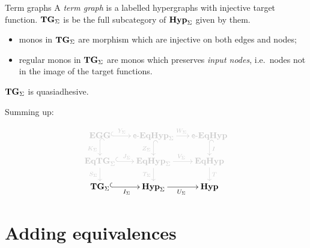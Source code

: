 \documentclass[aspectratio=169]{beamer}
\newcommand{\catname}[1]{\textbf{\textup{#1}}}
\newcommand{\tg}[0]{\catname{TG}_{\Sigma}}
\newcommand{\eg}{\catname{EGG}}
\newcommand{\egg}{\mathsf{e}\text{-}\catname{EqHyp}}
\newcommand{\hyp}{\catname{Hyp}}
\newcommand{\EqHyp}{\catname{EqHyp}} %
\newcommand{\EqTG}{\catname{EqTG}}
\begin{document}
\begin{frame}{Term graphs}
A \emph{term graph} \cite{corradini2005term,corradini1997algebraic, Plu:TGR-ENTCS} is a labelled hypergraphs with injective target function. $\tg$ is be the full subcategory of $\hyp_{\Sigma}$ given by them.

\pause 
\begin{itemize}
	\item monos in $\tg$ are morphism which are injective on both edges and nodes;\pause 
	\item regular monos in $\tg$ are monos which preserves \emph{input nodes}, i.e.~nodes not in the image of the target functions.
\end{itemize}
\pause 

\begin{theorem}
$\tg$ is quasiadhesive.
\end{theorem}

\end{frame}


\begin{frame}
	
	Summing up:
	
	
	\[\xymatrix@R=15pt@C=15pt{ \color{shaded}\eg \ar@{^{(}->}@[shaded][r]^-{\color{shaded}Y_\Sigma} \ar@{^{(}->}@[shaded][d]_{\color{shaded}K_\Sigma} & \color{shaded}\egg_\Sigma \ar@{^{(}->}@[shaded][d]_{\color{shaded} Z_\Sigma} \ar@[shaded][r]^{\color{shaded}W_\Sigma}&\color{shaded} \egg \ar@{^{(}->}@[shaded][d]^{\color{shaded}I}\\ \color{shaded}\EqTG_{\Sigma} \ar@{^{(}->}@[shaded][r]^{\color{shaded}J_\Sigma}\ar@[shaded][d]_{\color{shaded}S_\Sigma}&\color{shaded} \EqHyp_\Sigma \ar@[shaded][r]^{\color{shaded}V_\Sigma} \ar@[shaded][d]_{\color{shaded}T_\Sigma}&\color{shaded} \EqHyp \ar@[shaded][d]^{\color{shaded}T}\\ \tg \ar@{^{(}->}[r]_{I_\Sigma}& \hyp_{\Sigma} \ar[r]_{U_\Sigma}  &\hyp}\]
	
\end{frame}


\section{Adding equivalences}
\end{document}
